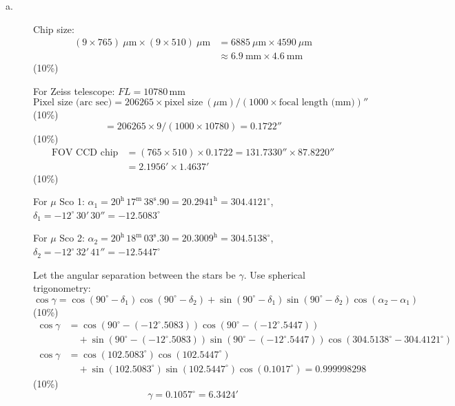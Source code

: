 \begin{description}
\item[a.] Chip size:
\begin{align*}
(9 \times 765)\ \mu\mathrm{m} \times (9 \times 510)\ \mu\mathrm{m}
&= 6885\ \mu\mathrm{m} \times 4590\ \mu\mathrm{m}\\
&\approx 6.9\ \mathrm{mm} \times 4.6\ \mathrm{mm}
\end{align*}
\hfill(10\%)

For Zeiss telescope: $FL = 10780$\,mm
\[
\text{Pixel size (arc sec)}
 = 206265 \times \text{pixel size}\ (\mu\mathrm{m})
   /(1000 \times \text{focal length (mm)})''
\]
\hfill(10\%)
\[
 = 206265 \times 9/(1000 \times 10780) = 0.1722''
\]
\hfill(10\%)
\begin{align*}
\text{FOV CCD chip} &= (765 \times 510) \times 0.1722
  = 131.7330'' \times 87.8220''\\
&= 2.1956' \times 1.4637'
\end{align*}
\hfill(10\%)

For $\mu$ Sco 1: $\alpha_1 = 20^{\mathrm{h}}\,17^{\mathrm{m}}\,38^{\mathrm{s}}.90
  = 20.2941^{\mathrm{h}} = 304.4121^\circ$,\quad
$\delta_1 = -12^\circ\,30'\,30'' = -12.5083^\circ$

For $\mu$ Sco 2: $\alpha_2 = 20^{\mathrm{h}}\,18^{\mathrm{m}}\,03^{\mathrm{s}}.30
  = 20.3009^{\mathrm{h}} = 304.5138^\circ$,\quad
$\delta_2 = -12^\circ\,32'\,41'' = -12.5447^\circ$

Let the angular separation between the stars be $\gamma$.
Use spherical trigonometry:
\[
\cos\gamma = \cos(90^\circ - \delta_1)\cos(90^\circ - \delta_2)
 + \sin(90^\circ - \delta_1)\sin(90^\circ - \delta_2)\cos(\alpha_2 - \alpha_1)
\]
\hfill(10\%)
\begin{align*}
\cos\gamma &= \cos(90^\circ - (-12^\circ.5083))\cos(90^\circ - (-12^\circ.5447))\\
&\quad + \sin(90^\circ - (-12^\circ.5083))\sin(90^\circ - (-12^\circ.5447))
   \cos(304.5138^\circ - 304.4121^\circ)\\
\cos\gamma &= \cos(102.5083^\circ)\cos(102.5447^\circ)\\
&\quad + \sin(102.5083^\circ)\sin(102.5447^\circ)\cos(0.1017^\circ)
 = 0.999998298
\end{align*}
\hfill(10\%)
\[
\gamma = 0.1057^\circ = 6.3424'
\]


\end{description}
